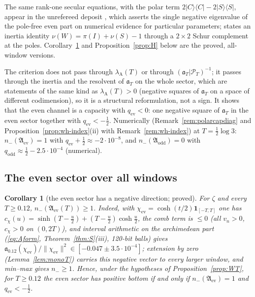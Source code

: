 \documentclass[11pt]{amsart}
\newtheorem{corollary}[theorem]{Corollary}
\theoremstyle{definition}
\theoremstyle{remark}
\newcommand{\PT}{\mathcal P_T}
\newcommand{\lamA}{\lambda_{\mathrm A}(T)}
\begin{document}
The same rank-one secular equations, with the polar term $2|C\rangle\langle C|-2|S\rangle\langle S|$, appear in the unrefereed deposit \cite{Silva2026}, which asserts the single negative eigenvalue of the pole-free even part on numerical evidence for particular parameters; \cite{Eberwein2026} states an inertia identity $\nu(W)=\pi(I)+\nu(S)-1$ through a $2\times2$ Schur complement at the poles. Corollary~\ref{cor:H1minus} and Proposition~\ref{prop:H} below are the proved, all-window versions.

The criterion does not pass through $\lamA$ or through $(\mathfrak a_T|\PT)^{-1}$; it passes through the inertia and the
resolvent of $\mathfrak a_T$ on the whole sector, which are statements of the same kind as $\lamA>0$ (negative squares of
$\mathfrak a_T$ on a space of different codimension), so it is a structural reformulation, not a sign. It shows that the even
channel is a capacity with $q_{\mathrm{ev}}<0$: one negative square of $\mathfrak a_T$ in the even sector together with
$q_{\mathrm{ev}}<-\frac12$. Numerically (Remark~\ref{rem:polarcapdiag} and Proposition~\ref{prop:wh-index}(ii) with
Remark~\ref{rem:wh-index}) at $T=\frac12\log3$: $n_-(\mathfrak A_{\mathrm{ev}})=1$ with $q_{\mathrm{ev}}+\frac12\approx-2\cdot10^{-8}$,
and $n_-(\mathfrak A_{\mathrm{odd}})=0$ with $q_{\mathrm{odd}}\approx\frac12-2.5\cdot10^{-4}$ (numerical).

\subsection{The even sector over all windows}\label{subsec:even-all}

\begin{corollary}[the even sector has a negative direction; proved]\label{cor:H1minus}
For $\zeta$ and every $T\ge0.12$, $n_-(\mathfrak A_{\mathrm{ev}}(T))\ge1$. Indeed, with $\chi_{\mathrm{ev}}=\cosh(t/2)\mathbf 1_{[-T,T]}$
one has $c_{\chi}(u)=\sinh(T-\tfrac u2)+(T-\tfrac u2)\cosh\tfrac u2$, the comb term is $\le0$ (all $v_n>0$, $c_\chi>0$ on $(0,2T)$),
and interval arithmetic on the archimedean part (\eqref{eq:Aform}, Theorem~\ref{thm:S}(iii), 120-bit balls) gives
$\mathfrak a_{0.12}(\chi_{\mathrm{ev}})/\|\chi_{\mathrm{ev}}\|^2\in[-0.047\pm3.5\cdot10^{-4}]$; extension by zero
(Lemma~\ref{lem:monoT}) carries this negative vector to every larger window, and min--max gives $n_-\ge1$. Hence, under the
hypotheses of Proposition~\ref{prop:WT}, for $T\ge0.12$ the even sector has positive bottom if and only if
$n_-(\mathfrak A_{\mathrm{ev}})=1$ and $q_{\mathrm{ev}}<-\tfrac12$.
\end{corollary}
\end{document}

